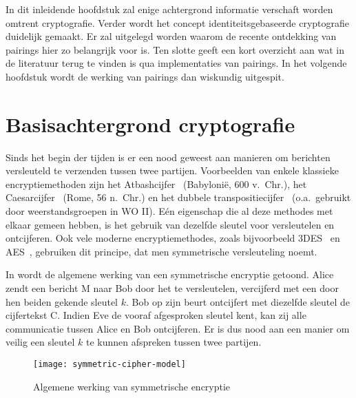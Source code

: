 
 In dit inleidende hoofdstuk zal enige achtergrond informatie verschaft worden omtrent cryptografie. Verder wordt het concept identiteitsgebaseerde cryptografie duidelijk gemaakt. Er zal uitgelegd worden waarom de recente ontdekking van pairings hier zo belangrijk voor is. Ten slotte geeft een kort overzicht aan wat in de literatuur terug te vinden is qua implementaties van pairings. In het volgende hoofdstuk wordt de werking van pairings dan wiskundig uitgespit.

\section{Basisachtergrond cryptografie}

Sinds het begin der tijden is er een nood geweest aan manieren om berichten versleuteld te verzenden tussen twee partijen. Voorbeelden van enkele klassieke encryptiemethoden zijn het Atbashcijfer~\cite{athbash} (Babyloni\"e, 600 v.\ Chr.), het Caesarcijfer~\cite{caesar} (Rome, 56 n.\ Chr.) en het dubbele transpositiecijfer~\cite{kahn} (o.a.\ gebruikt door weerstandsgroepen in WO II). E\'en eigenschap die al deze methodes met elkaar gemeen hebben, is het gebruik van dezelfde sleutel voor versleutelen en ontcijferen. Ook vele moderne encryptiemethodes, zoals bijvoorbeeld 3DES~\cite{3des} en AES~\cite{aes}, gebruiken dit principe, dat men symmetrische versleuteling noemt.

In  wordt de algemene werking van een symmetrische encryptie getoond. Alice zendt een bericht M naar Bob door het te versleutelen, vercijferd met een door hen beiden gekende sleutel $k$. Bob op zijn beurt ontcijfert met diezelfde sleutel de cijfertekst C. Indien Eve de vooraf afgesproken sleutel kent, kan zij alle communicatie tussen Alice en Bob ontcijferen. Er is dus nood aan een manier om veilig een sleutel $k$ te kunnen afspreken tussen twee partijen.

\begin{figure}[h]
	\centering
		\texttt{[image: symmetric-cipher-model]}
		\caption{Algemene werking van symmetrische encryptie\label{fig-encryptie-applicaties-sym-cipher}}
\end{figure}

